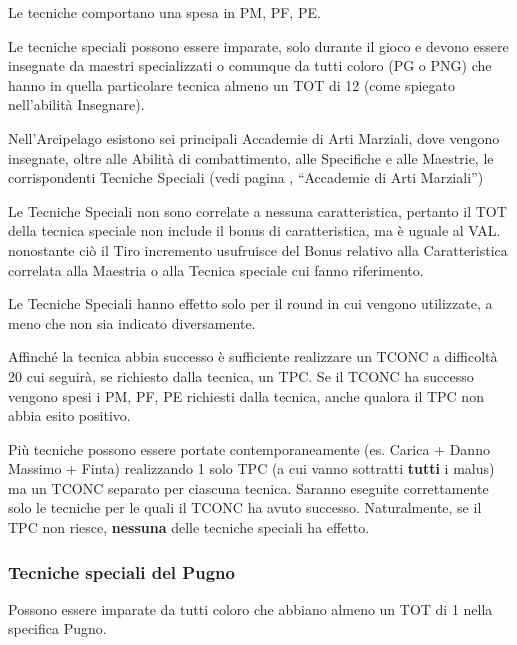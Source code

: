 Le tecniche comportano una spesa in PM,
PF, PE. 

Le tecniche speciali possono essere imparate,
solo durante il gioco e devono essere insegnate da maestri
specializzati o comunque da tutti coloro (PG o PNG) che hanno in
quella particolare tecnica almeno un TOT di 12 (come spiegato
nell'abilit\`a Insegnare). 

Nell'Arcipelago esistono sei principali Accademie di Arti Marziali,
dove vengono insegnate, oltre alle Abilit\`a di combattimento, alle
Specifiche e alle Maestrie, le corrispondenti Tecniche Speciali (vedi
pagina \pageref{accademiemarziali}, ``Accademie di Arti Marziali'')



Le Tecniche Speciali non sono correlate a nessuna
caratteristica, pertanto il TOT della tecnica speciale non include il
bonus di caratteristica, ma \`e uguale al VAL. nonostante ci\`o il
Tiro incremento usufruisce del Bonus relativo alla Caratteristica
correlata alla Maestria o alla Tecnica speciale cui fanno riferimento.

Le Tecniche Speciali hanno effetto solo per il round in cui vengono
utilizzate, a meno che non sia indicato diversamente. 

Affinch\'e la tecnica abbia successo \`e sufficiente realizzare un
TCONC a difficolt\`a 20 cui seguir\`a, se richiesto dalla tecnica, un
TPC. Se il TCONC ha successo vengono spesi i PM, PF, PE richiesti
dalla tecnica, anche qualora il TPC non abbia esito positivo.

Pi\`u tecniche possono essere portate contemporaneamente (es. Carica +
Danno Massimo + Finta) realizzando 1 solo TPC (a cui vanno sottratti
\textbf{tutti} i malus) ma un TCONC separato per ciascuna tecnica.
Saranno eseguite correttamente solo le tecniche per le quali il TCONC
ha avuto successo. Naturalmente, se il TPC non riesce,
\textbf{nessuna} delle tecniche speciali ha effetto.

\subsubsection{Tecniche speciali del Pugno} 

Possono essere imparate da tutti coloro che abbiano almeno
un TOT di 1 nella specifica Pugno.

\newcommand{\mae}[6] {
\item{\bf #1 $\Diamond$ D#2 --} 
  #3 
  \begin{itemize}
    \itemsep -3pt 
  \item \makebox[3em][l]{\bf PF:}#4
  \item\makebox[3em][l]{\bf PM:}#5
  \item \makebox[3em][l]{\bf PE:}#6
  \end{itemize}
  }

